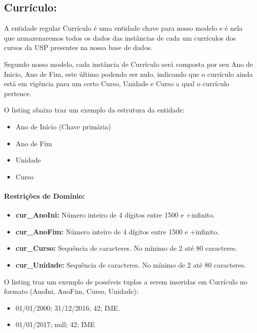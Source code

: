 \documentclass{report}
\begin{document}
\subsection{Currículo:}
A entidade regular Currículo é uma entidade chave para nosso modelo e é nela que armazenaremos todos os dados das instâncias de cada um currículos dos cursos da USP presentes na nossa base de dados.
  
  Segundo nosso modelo, cada instância de Currículo será composta por seu Ano de Inicio, Ano de Fim, este último podendo ser nulo, indicando que o currículo ainda está em vigência para um certo Curso, Unidade e Curso a qual o currículo pertence.
    
  O listing abaixo traz um exemplo da estrutura da entidade:
\begin{itemize}
  \item Ano de Início (Chave primária)
   \item Ano de Fim
   \item Unidade
   \item Curso
\end{itemize}
\paragraph{Restrições de Domínio:}
\begin{itemize}
  \item \textbf{cur\_AnoIni:} Número inteiro de 4 dígitos entre 1500 e +infinito.
   \item \textbf{cur\_AnoFim:} Número inteiro de 4 dígitos entre 1500 e +infinito.
   \item \textbf{cur\_Curso:} Sequência de caracteres. No mínimo de 2 até 80 caracteres.
   \item \textbf{cur\_Unidade:} Sequência de caracteres. No mínimo de 2 até 80 caracteres.
\end{itemize}
O listing traz um exemplo de possíveis tuplas a serem inseridas em Currículo no formato (AnoIni, AnoFim, Curso, Unidade):

\begin{itemize}
  \item 01/01/2000; 31/12/2016; 42; IME. 
  \item 01/01/2017; null; 42; IME
\end{itemize}
\iffalse
\end{document}
